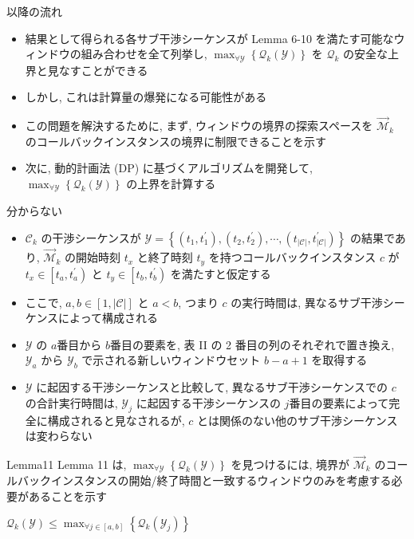 \begin{frame}{以降の流れ}
    \begin{itemize}
        \item 結果として得られる各サブ干渉シーケンスが Lemma 6-10 を満たす可能なウィンドウの組み合わせを全て列挙し, $\max _{\forall \mathcal{Y}}\left\{\mathcal{Q}_{k}(\mathcal{Y})\right\}$ を $\mathcal{Q}_{k}$ の安全な上界と見なすことができる
        \item しかし, これは計算量の爆発になる可能性がある
        \item この問題を解決するために, まず, ウィンドウの境界の探索スペースを $\overrightarrow{\mathcal{M}}_{k}$ のコールバックインスタンスの境界に制限できることを示す
        \item 次に, 動的計画法 (DP) に基づくアルゴリズムを開発して, $\max _{\forall \mathcal{Y}}\left\{\mathcal{Q}_{k}(\mathcal{Y})\right\}$ の上界を計算する
    \end{itemize}
\end{frame}

\begin{frame}{分からない}
    \begin{itemize}
        \item $\mathcal{C}_{k}$ の干渉シーケンスが $\mathcal{Y}=\left\{\left(t_{1}, t_{1}^{\prime}\right),\left(t_{2}, t_{2}^{\prime}\right), \cdots,\left(t_{|\mathcal{C}|}, t_{|\mathcal{C}|}^{\prime}\right)\right\}$ の結果であり, $\overrightarrow{\mathcal{M}}_{k}$ の開始時刻 $t_{x}$ と終了時刻 $t_{y}$ を持つコールバックインスタンス $c$ が $t_{x} \in\left[t_{a}, t_{a}^{\prime}\right)$ と $t_{y} \in\left[t_{b}, t_{b}^{\prime}\right)$ を満たすと仮定する
        \item ここで, $a, b \in[1,|\mathcal{C}|]$ と $a<b$, つまり $c$ の実行時間は, 異なるサブ干渉シーケンスによって構成される
        \item $\mathcal{Y}$ の $ a $番目から $ b $番目の要素を, 表 II の 2 番目の列のそれぞれで置き換え, $\mathcal{Y}_{a}$ から $\mathcal{Y}_{b}$ で示される新しいウィンドウセット $b-a+1$ を取得する
        \item $\mathcal{Y}$ に起因する干渉シーケンスと比較して, 異なるサブ干渉シーケンスでの $c$ の合計実行時間は, $\mathcal{Y}_{j}$ に起因する干渉シーケンスの $ j $番目の要素によって完全に構成されると見なされるが, $c$ とは関係のない他のサブ干渉シーケンスは変わらない
    \end{itemize}
\end{frame}

\begin{frame}{Lemma11}
    Lemma 11 は, $\max _{\forall \mathcal{Y}}\left\{\mathcal{Q}_{k}(\mathcal{Y})\right\}$ を見つけるには, 境界が $\overrightarrow{\mathcal{M}}_{k}$ のコールバックインスタンスの開始/終了時間と一致するウィンドウのみを考慮する必要があることを示す
    \begin{lemma}[]
        $\mathcal{Q}_{k}(\mathcal{Y}) \leq \max _{\forall j \in[a, b]}\left\{\mathcal{Q}_{k}\left(\mathcal{Y}_{j}\right)\right\}$
    \end{lemma}
\end{frame}

